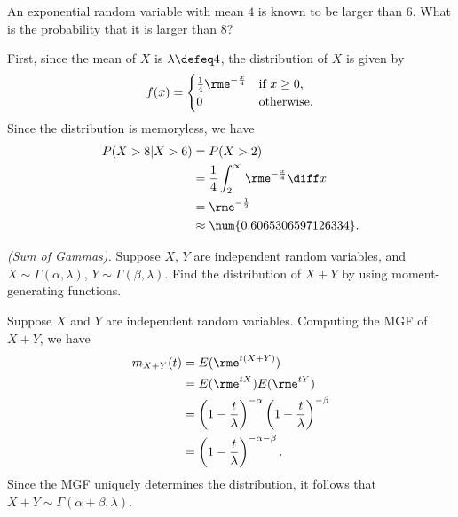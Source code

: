\begin{problem}[Handout 13, \# 17]
  An exponential random variable with mean \(4\) is known to be larger than
  \(6\). What is the probability that it is larger than \(8\)?
\end{problem}
\begin{solution}
  First, since the mean of \(X\) is \(\lambda\defeq 4\), the distribution
  of \(X\) is given by
  \[
    f(x)=
    \begin{cases}
      \frac{1}{4}\rme^{-\frac{x}{4}}&\text{if \(x\geq 0\),}\\
      0&\text{otherwise.}
    \end{cases}
  \]
  Since the distribution is memoryless, we have
  \begin{align*}
    P(X>8|X>6)
    &=P(X>2)\\
    &=\frac{1}{4}\int_2^\infty\rme^{-\frac{x}{4}}\diff x\\
    &=\rme^{-\frac{1}{2}}\\
    &\approx\num{0.6065306597126334}.
  \end{align*}
\end{solution}
\newpage

\begin{problem}[Handout 13, \# 18]
  \emph{(Sum of Gammas).} Suppose \(X\), \(Y\) are independent random
  variables, and \(X\sim \Gamma(\alpha,\lambda)\),
  \(Y\sim \Gamma(\beta,\lambda)\). Find the distribution of \(X+Y\) by
  using moment-generating functions.
\end{problem}
\begin{solution}
  Suppose \(X\) and \(Y\) are independent random variables. Computing the
  MGF of \(X+Y\), we have
  \begin{align*}
    m_{X+Y}(t)
    &=E(\rme^{t(X+Y)})\\
    &=E(\rme^{tX})E(\rme^{tY})\\
    &=\left(1-\frac{t}{\lambda}\right)^{-\alpha}\left(1-\frac{t}{\lambda}\right)^{-\beta}\\
    &=\left(1-\frac{t}{\lambda}\right)^{-\alpha-\beta}.
  \end{align*}
  Since the MGF uniquely determines the distribution, it follows that
  \(X+Y\sim\Gamma(\alpha+\beta,\lambda)\).
\end{solution}
\newpage

